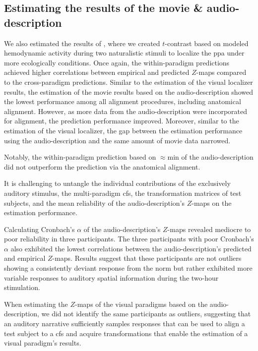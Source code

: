 \subsection{Estimating the results of the movie \& audio-description}
%
We also estimated the results of \citet{haeusler2022processing}, where we
created $t$-contrast based on modeled hemodynamic activity during two
naturalistic stimuli to localize the \ac{ppa} under more ecologically
conditions.
%
Once again, the within-paradigm predictions achieved higher correlations between
empirical and predicted $Z$-maps compared to the cross-paradigm predictions.
%
Similar to the estimation of the visual localizer results, the estimation of the
movie results based on the audio-description showed the lowest performance among
all alignment procedures, including anatomical alignment.
%
However, as more data from the audio-description were incorporated for
alignment, the prediction performance improved.
%
Moreover, similar to the estimation of the visual localizer, the gap between the
estimation performance using the audio-description and the same amount of movie
data narrowed.


%
Notably, the within-paradigm prediction based on $\approx$\unit[15]{min} of the
audio-description did not outperform the prediction via the anatomical
alignment.

%
It is challenging to untangle the individual contributions of the exclusively
auditory stimulus, the multi-paradigm \ac{cfs}, the transformation matrices of
test subjects, and the mean reliability of the audio-description's $Z$-maps on
the estimation performance.


%
Calculating Cronbach's $\alpha$ of the audio-description's $Z$-maps revealed
mediocre to poor reliability in three participants.
%
The three participants with poor Cronbach's $\alpha$ also exhibited the lowest
correlations between the audio-description's predicted and empirical $Z$-maps.
%
Results suggest that these participants are not outliers showing a consistently
deviant response from the norm but rather exhibited more variable responses to
auditory spatial information during the two-hour stimulation.

%
When estimating the $Z$-maps of the visual paradigms based on the
audio-description, we did not identify the same participants as outliers,
suggesting that an auditory narrative sufficiently samples responses that can be
used to align a test subject to a \ac{cfs} and acquire transformations that
enable the estimation of a visual paradigm's results.

